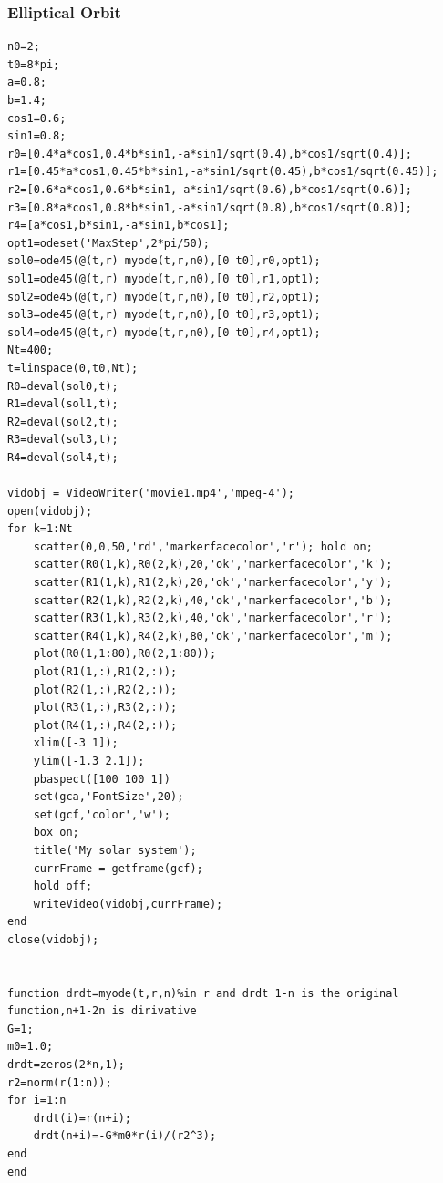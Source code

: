 \documentclass{article}
\begin{document}
\subsubsection{Elliptical Orbit}
\begin{lstlisting}
n0=2;
t0=8*pi;
a=0.8;
b=1.4;
cos1=0.6;
sin1=0.8;
r0=[0.4*a*cos1,0.4*b*sin1,-a*sin1/sqrt(0.4),b*cos1/sqrt(0.4)];
r1=[0.45*a*cos1,0.45*b*sin1,-a*sin1/sqrt(0.45),b*cos1/sqrt(0.45)];
r2=[0.6*a*cos1,0.6*b*sin1,-a*sin1/sqrt(0.6),b*cos1/sqrt(0.6)];
r3=[0.8*a*cos1,0.8*b*sin1,-a*sin1/sqrt(0.8),b*cos1/sqrt(0.8)];
r4=[a*cos1,b*sin1,-a*sin1,b*cos1];
opt1=odeset('MaxStep',2*pi/50);
sol0=ode45(@(t,r) myode(t,r,n0),[0 t0],r0,opt1);
sol1=ode45(@(t,r) myode(t,r,n0),[0 t0],r1,opt1);
sol2=ode45(@(t,r) myode(t,r,n0),[0 t0],r2,opt1);
sol3=ode45(@(t,r) myode(t,r,n0),[0 t0],r3,opt1);
sol4=ode45(@(t,r) myode(t,r,n0),[0 t0],r4,opt1);
Nt=400;
t=linspace(0,t0,Nt);
R0=deval(sol0,t);
R1=deval(sol1,t);
R2=deval(sol2,t);
R3=deval(sol3,t);
R4=deval(sol4,t);

vidobj = VideoWriter('movie1.mp4','mpeg-4');
open(vidobj);
for k=1:Nt
    scatter(0,0,50,'rd','markerfacecolor','r'); hold on;
    scatter(R0(1,k),R0(2,k),20,'ok','markerfacecolor','k');
    scatter(R1(1,k),R1(2,k),20,'ok','markerfacecolor','y');
    scatter(R2(1,k),R2(2,k),40,'ok','markerfacecolor','b');
    scatter(R3(1,k),R3(2,k),40,'ok','markerfacecolor','r');
    scatter(R4(1,k),R4(2,k),80,'ok','markerfacecolor','m');
    plot(R0(1,1:80),R0(2,1:80));
    plot(R1(1,:),R1(2,:));
    plot(R2(1,:),R2(2,:));
    plot(R3(1,:),R3(2,:));
    plot(R4(1,:),R4(2,:));
    xlim([-3 1]);
    ylim([-1.3 2.1]);
    pbaspect([100 100 1])
    set(gca,'FontSize',20);
    set(gcf,'color','w');
    box on;
    title('My solar system');
    currFrame = getframe(gcf);
    hold off;
    writeVideo(vidobj,currFrame);
end
close(vidobj);


function drdt=myode(t,r,n)%in r and drdt 1-n is the original function,n+1-2n is dirivative
G=1;
m0=1.0;
drdt=zeros(2*n,1);
r2=norm(r(1:n));
for i=1:n
    drdt(i)=r(n+i);
    drdt(n+i)=-G*m0*r(i)/(r2^3);
end
end
\end{lstlisting}
\end{document}
